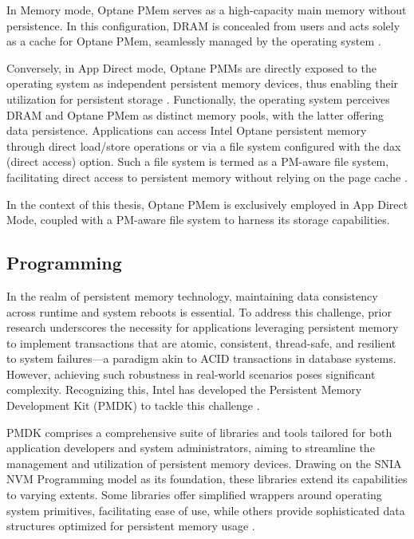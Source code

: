 In Memory mode, Optane PMem serves as a high-capacity main memory without persistence. In this configuration, DRAM is concealed from users and acts solely as a cache for Optane PMem, seamlessly managed by the operating system \cite{yang2020empirical}. 

Conversely, in App Direct mode, Optane PMMs are directly exposed to the operating system as independent persistent memory devices, thus enabling their utilization for persistent storage \cite{izraelevitz2019basic}. Functionally, the operating system perceives DRAM and Optane PMem as distinct memory pools, with the latter offering data persistence. Applications can access Intel Optane persistent memory through direct load/store operations or via a file system configured with the \textrm{dax} (direct access) option. Such a file system is termed as a PM-aware file system, facilitating direct access to persistent memory without relying on the page cache \cite{rudoff2017persistent,Speeding28:online}.

In the context of this thesis, Optane PMem is exclusively employed in App Direct Mode, coupled with a PM-aware file system to harness its storage capabilities.

\subsection{Programming}

In the realm of persistent memory technology, maintaining data consistency across runtime and system reboots is essential. To address this challenge, prior research underscores the necessity for applications leveraging persistent memory to implement transactions that are atomic, consistent, thread-safe, and resilient to system failures—a paradigm akin to ACID transactions in database systems. However, achieving such robustness in real-world scenarios poses significant complexity. Recognizing this, Intel has developed the Persistent Memory Development Kit (PMDK) to tackle this challenge \cite{scargall2020pmem,rudoff2017persistent}.

PMDK comprises a comprehensive suite of libraries and tools tailored for both application developers and system administrators, aiming to streamline the management and utilization of persistent memory devices. Drawing on the SNIA NVM Programming model \cite{NVMProgr73:online} as its foundation, these libraries extend its capabilities to varying extents. Some libraries offer simplified wrappers around operating system primitives, facilitating ease of use, while others provide sophisticated data structures optimized for persistent memory usage \cite{scargall2020pmem}.

